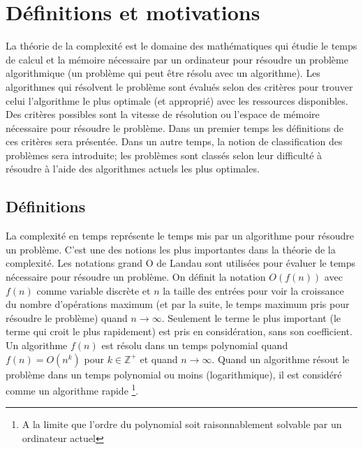\documentclass[../main.tex]{subfiles}
\begin{document}
\section{Définitions et motivations}
La théorie de la complexité est le domaine des mathématiques qui étudie le temps de calcul et la mémoire nécessaire par un ordinateur pour résoudre un problème algorithmique (un problème qui peut être résolu avec un algorithme). Les algorithmes qui résolvent le problème sont évalués selon des critères pour trouver celui l'algorithme le plus optimale (et approprié) avec les ressources disponibles. Des critères possibles sont la vitesse de résolution ou l'espace de mémoire nécessaire pour résoudre le problème. Dans un premier temps les définitions de ces critères sera présentée. Dans un autre temps, la notion de classification des problèmes sera introduite; les problèmes sont classés selon leur \og difficulté \fg{} à résoudre à l'aide des algorithmes actuels les plus optimales.

\subsection{Définitions}
\begin{definition}
La complexité en temps représente le temps mis par un algorithme pour résoudre un problème. C'est une des notions les plus importantes dans la théorie de la complexité. Les notations grand O de Landau sont utilisées pour évaluer le temps nécessaire pour résoudre un problème. On définit la notation $O(f(n))$ avec $f(n)$ comme variable discrète et $n$ la taille des entrées pour voir la croissance du nombre d'opérations maximum (et par la suite, le temps maximum pris pour résoudre le problème) quand $n\to\infty$. Seulement le terme le plus important (le terme qui croit le plus rapidement) est pris en considération, sans son coefficient. Un algorithme $f(n)$ est résolu dans un temps polynomial quand $f(n)=O(n^k)$ pour $k \in \mathbb{Z}^+$ et quand $n\to\infty$. Quand un algorithme résout le problème dans un temps polynomial ou moins (logarithmique), il est considéré comme un algorithme rapide \footnote{A la limite que l'ordre du polynomial soit raisonnablement solvable par un ordinateur actuel}.
\end{definition}
\end{document}
